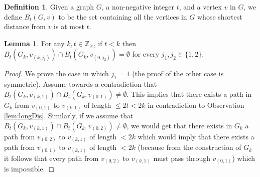 \documentclass{article}
\theoremstyle{definition}
\newtheorem{definition}{Definition}[section]
\newtheorem{lemma}{Lemma}[section]
\def \Z {{\mathbb Z}}
\begin{document}
%
\begin{definition}
	Given a graph $G$, a non-negative integer $t$, and a vertex $v$ in $G$, we define $B_{t}(G,v)$ to be the set containing all the vertices in $G$ whose shortest distance from $v$ is at most $t$.
\end{definition}

\begin{lemma} For any $k,t \in \Z_{\ge}$, if $t < k$ then $B_{t}(G_{k},v_{(k,j_{1})}) \cap B_{t}(G_{k},v_{(0,j_{2})}) = \emptyset$ for every $j_{1},j_{2} \in \{1,2\}$.\label{lem:disBalls}\end{lemma}

\begin{proof} We prove the case in which $j_{1} = 1$ (the proof of the other case is symmetric). Assume towards a contradiction that $B_{t}(G_{k},v_{(k,1)}) \cap B_{t}(G_{k},v_{(0,1)}) \ne \emptyset$. This implies that there exists a path in $G_{k}$ from $v_{(0,1)}$ to $v_{(k,1)}$ of length $\le 2t < 2k$ in contradiction to Observation \ref{lem:longDis}. Similarly, if we assume that $B_{t}(G_{k},v_{(k,1)}) \cap B_{t}(G_{k},v_{(0,2)}) \ne \emptyset$, we would get that there exists in $G_{k}$ a path from $v_{(0,2)}$ to $v_{(k,1)}$ of length $< 2k$ which would imply that there exists a path from $v_{(0,1)}$ to $v_{(k,1)}$ of length $< 2k$ (because from the construction of $G_{k}$ it follows that every path from $v_{(0,2)}$ to $v_{(k,1)}$ must pass through $v_{(0,1)}$) which is impossible.\end{proof}
\end{document}
